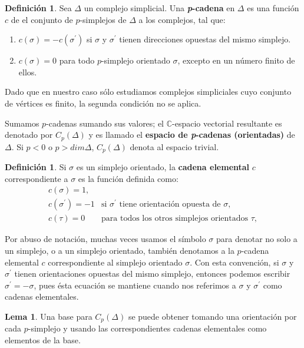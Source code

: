 \documentclass[12pt]{book}
\theoremstyle{definition}
\newtheorem{definition}[theorem]{Definición}
\newtheorem{lemma}[theorem]{Lema}
\newcounter{in}
\newcounter{ini}
\begin{document}
\begin{definition}
  Sea $\Delta$ un complejo simplicial. Una \textbf{\emph{p}-cadena} en
  $\Delta$ es una función $c$ de el conjunto de $p$-simplejos de
  $\Delta$ a los complejos, tal que:
  \begin{enumerate}
    \item $c(\sigma)=-c(\sigma^{'})$ si $\sigma$ y $\sigma^{'}$ tienen
      direcciones opuestas del mismo simplejo.
    \item $c(\sigma)=0$ para todo $p$-simplejo orientado $\sigma$,
      excepto en un número finito de ellos.
  \end{enumerate} 
\end{definition}

Dado que en nuestro caso sólo estudiamos complejos simpliciales cuyo
conjunto de vértices es finito, la segunda condición no se aplica.

Sumamos $p$-cadenas sumando sus valores; el $\mathbb{C}$-espacio vectorial resultante es
denotado por $C_{p}(\Delta)$ y es llamado el \textbf{espacio de
  \emph{p}-cadenas (orientadas)} de $\Delta$. Si $p<0$ o $p>dim \Delta$,
$C_{p}(\Delta)$ denota al espacio trivial.

\begin{definition}
  Si $\sigma$ es un simplejo orientado, la \textbf{cadena elemental} $c$
  correspondiente a $\sigma$ es la función definida como:
  \[ 
  \begin{array}{cl}
    c(\sigma)=1, & \\
    c(\sigma^{'})=-1 & \mbox{si $\sigma^{'}$ tiene orientación opuesta de $\sigma$}, \\
    c(\tau)=0 & \mbox{para todos los otros simplejos orientados $\tau$}, 
  \end{array}\] 
  \end{definition}

Por abuso de notación, muchas veces usamos el símbolo $\sigma$ para
denotar no solo a un simplejo, o a un simplejo orientado, también
denotamos a la $p$-cadena elemental $c$ correspondiente al simplejo
orientado $\sigma$. Con esta convención, si $\sigma$ y $\sigma^{'}$
tienen orientaciones opuestas del mismo simplejo, entonces podemos
escribir $\sigma^{'}=-\sigma$, pues ésta ecuación se mantiene cuando
nos referimos a $\sigma$ y $\sigma^{'}$ como cadenas elementales.

\begin{lemma}
   Una base para $C_{p}(\Delta)$ se puede obtener
   tomando una orientación por cada $p$-simplejo y usando las
   correspondientes cadenas elementales como elementos de la base.
\end{lemma}
\end{document}
